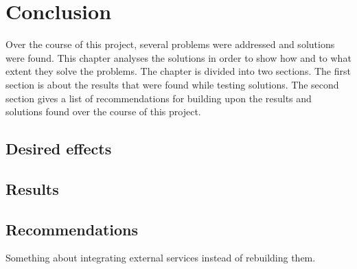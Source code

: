 \chapter{Conclusion}

Over the course of this project, several problems were addressed and solutions were found. This chapter analyses the solutions in order to show how and to what extent they solve the problems. The chapter is divided into two sections. The first section is about the results that were found while testing solutions. The second section gives a list of recommendations for building upon the results and solutions found over the course of this project.

\section{Desired effects}

\section{Results}

\section{Recommendations}
Something about integrating external services instead of rebuilding them.
